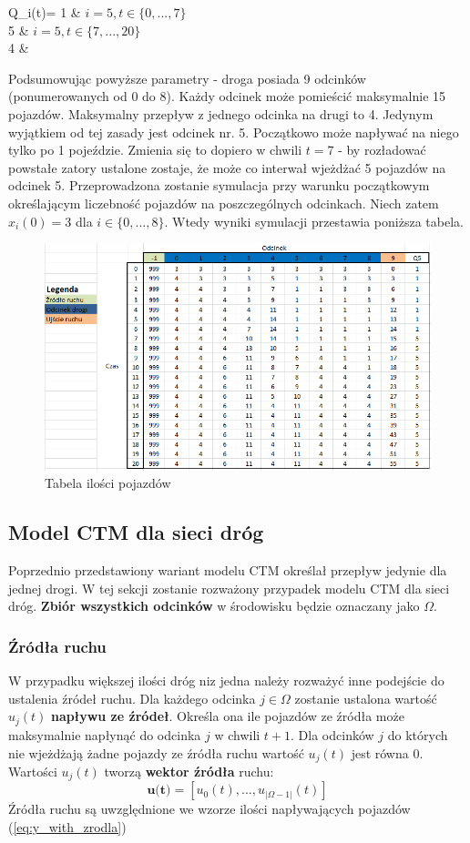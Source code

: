 \documentclass[12pt]{book}
\theoremstyle{plain}
\newcommand{\myref}[1]{(\ref{#1})}
\begin{document}
	 \begin{numcases}{Q_i(t)=}
	1 &  $i=5, t\in \{0,...,7\}$ \\ 
    5 &  $i=5, t\in \{7,...,20\}$ \\ 	
	4 & 
	\end{numcases}
Podsumowując powyższe parametry - droga posiada 9 odcinków (ponumerowanych od 0 do 8). Każdy odcinek może pomieścić maksymalnie 15 pojazdów. Maksymalny przepływ z jednego odcinka na drugi to 4. Jedynym wyjątkiem od tej zasady jest odcinek nr. 5. Początkowo może napływać na niego tylko po 1 pojeździe. Zmienia się to dopiero w chwili $t=7$ - by rozładować powstałe zatory ustalone zostaje, że może co interwał wjeżdżać 5 pojazdów na odcinek 5. Przeprowadzona zostanie symulacja przy warunku początkowym określającym liczebność pojazdów na poszczególnych odcinkach. Niech zatem $x_i(0)=3$ dla $i \in \{0,...,8\}$. Wtedy wyniki symulacji przestawia poniższa tabela.
\begin{figure}[H]
	\centering
	\includegraphics[width=14cm]{images/ctm_przyklad}
	\caption{Tabela ilości pojazdów}
	\label{fig:ctm_przyklad}\end{figure}
\subsection{Model CTM dla sieci dróg}
Poprzednio przedstawiony wariant modelu CTM określał przepływ jedynie dla jednej drogi. W tej sekcji zostanie rozważony przypadek modelu CTM dla sieci dróg. \textbf{Zbiór wszystkich odcinków} w środowisku będzie oznaczany jako $\Omega$. 
\subsubsection{Źródła ruchu}
W przypadku większej ilości dróg niz jedna należy rozważyć inne podejście do ustalenia źródeł ruchu. 
Dla każdego odcinka $j \in \Omega$ zostanie ustalona wartość $u_j(t)$ \textbf{napływu ze źródeł}. Określa ona ile pojazdów ze źródła może maksymalnie napłynąć do odcinka $j$ w chwili $t+1$. Dla odcinków $j$ do których nie wjeżdżają żadne pojazdy ze źródła ruchu wartość $u_j(t)$ jest równa 0. Wartości $u_j(t)$ tworzą \textbf{wektor źródła} ruchu:
\[\textbf{u(t)}=[u_0(t),...,u_{|\Omega-1|}(t)]\]
Źródła ruchu są uwzględnione we wzorze ilości napływających pojazdów \myref{eq:y_with_zrodla}
\end{document}
